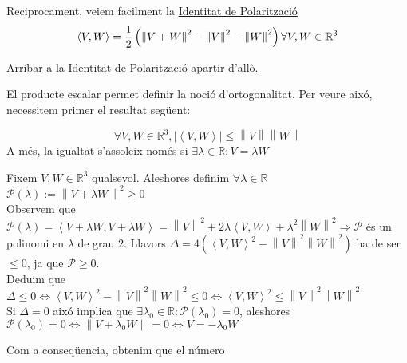 \documentclass[../main.tex]{subfiles}
\begin{document}
Reciprocament, veiem facilment la \underline{Identitat de Polarització}
\begin{displaymath}
    \left\langle V, W\right\rangle = \frac{1}{2}\left(\left\lVert V+W\right\rVert^2 - \left\lVert V\right\rVert^2 - \left\lVert W\right\rVert^2\right)\\
    \forall V, W \in \mathbb{R}^3
\end{displaymath}
\begin{exercici}
    Arribar a la Identitat de Polarització apartir d'allò.
\end{exercici}
El producte escalar permet definir la noció d'ortogonalitat. Per veure aixó, necessitem primer el
resultat següent:
\begin{teorema}
    \begin{displaymath}
        \forall V, W \in \mathbb{R}^3, \left\lvert \left\langle V, W\right\rangle \right\rvert \leq \left\lVert V\right\rVert \left\lVert W\right\rVert
    \end{displaymath}
    A més, la igualtat s'assoleix només si $\exists \lambda \in \mathbb{R}: V = \lambda W$
\end{teorema}
\begin{demostracio}
    Fixem $V, W \in \mathbb{R}^3$ qualsevol. Aleshores definim $\forall\lambda\in\mathbb{R}$\\$\mathcal{P}(\lambda):=\left\lVert V+\lambda W\right\rVert^2 \geq 0$\\
    Observem que $\mathcal{P}(\lambda)=\left\langle V+\lambda W, V+\lambda W\right\rangle = \left\lVert V\right\rVert^2 + 2\lambda\left\langle V,W\right\rangle + \lambda^2\left\lVert W\right\rVert^2 \Rightarrow \mathcal{P}$
    és un polinomi en $\lambda$ de grau $2$. Llavors $\Delta = 4\left(\left\langle V,W\right\rangle^2 - \left\lVert V\right\rVert^2\left\lVert W\right\rVert^2\right)$ ha de ser $\leq 0$, ja que $\mathcal{P} \geq 0$.\\
    Deduim que $\Delta \leq 0 \iff \left\langle V, W\right\rangle^2-\left\lVert V\right\rVert^2\left\lVert W\right\rVert^2 \leq 0 \iff \left\langle V, W\right\rangle^2\leq\left\lVert V\right\rVert^2\left\lVert W\right\rVert^2$\\
    Si $\Delta = 0$ aixó implica que $\exists \lambda_0 \in \mathbb{R} : \mathcal{P}\left(\lambda_0\right) = 0$, aleshores $\mathcal{P}\left(\lambda_0\right) = 0 \iff \left\lVert V+\lambda_0 W\right\rVert = 0 \iff V = - \lambda_0 W$
\end{demostracio}
Com a conseqüencia, obtenim que el número
\end{document}

